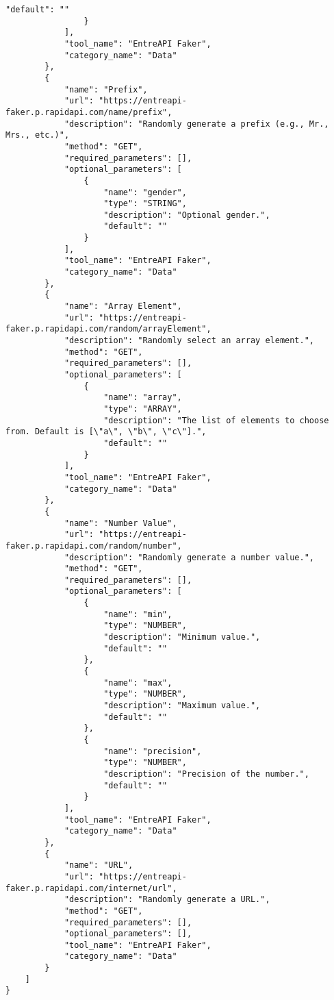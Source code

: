 \begin{lstlisting}[basicstyle=\ttfamily, breaklines=true]
                    "default": ""
                }
            ],
            "tool_name": "EntreAPI Faker",
            "category_name": "Data"
        },
        {
            "name": "Prefix",
            "url": "https://entreapi-faker.p.rapidapi.com/name/prefix",
            "description": "Randomly generate a prefix (e.g., Mr., Mrs., etc.)",
            "method": "GET",
            "required_parameters": [],
            "optional_parameters": [
                {
                    "name": "gender",
                    "type": "STRING",
                    "description": "Optional gender.",
                    "default": ""
                }
            ],
            "tool_name": "EntreAPI Faker",
            "category_name": "Data"
        },
        {
            "name": "Array Element",
            "url": "https://entreapi-faker.p.rapidapi.com/random/arrayElement",
            "description": "Randomly select an array element.",
            "method": "GET",
            "required_parameters": [],
            "optional_parameters": [
                {
                    "name": "array",
                    "type": "ARRAY",
                    "description": "The list of elements to choose from. Default is [\"a\", \"b\", \"c\"].",
                    "default": ""
                }
            ],
            "tool_name": "EntreAPI Faker",
            "category_name": "Data"
        },
        {
            "name": "Number Value",
            "url": "https://entreapi-faker.p.rapidapi.com/random/number",
            "description": "Randomly generate a number value.",
            "method": "GET",
            "required_parameters": [],
            "optional_parameters": [
                {
                    "name": "min",
                    "type": "NUMBER",
                    "description": "Minimum value.",
                    "default": ""
                },
                {
                    "name": "max",
                    "type": "NUMBER",
                    "description": "Maximum value.",
                    "default": ""
                },
                {
                    "name": "precision",
                    "type": "NUMBER",
                    "description": "Precision of the number.",
                    "default": ""
                }
            ],
            "tool_name": "EntreAPI Faker",
            "category_name": "Data"
        },
        {
            "name": "URL",
            "url": "https://entreapi-faker.p.rapidapi.com/internet/url",
            "description": "Randomly generate a URL.",
            "method": "GET",
            "required_parameters": [],
            "optional_parameters": [],
            "tool_name": "EntreAPI Faker",
            "category_name": "Data"
        }
    ]
}
\end{lstlisting}
